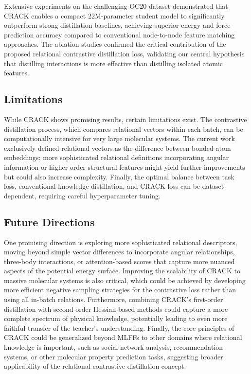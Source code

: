\documentclass{article}
\begin{document}
Extensive experiments on the challenging OC20 dataset demonstrated that CRACK enables a compact 22M-parameter student model to significantly outperform strong distillation baselines, achieving superior energy and force prediction accuracy compared to conventional node-to-node feature matching approaches.
The ablation studies confirmed the critical contribution of the proposed relational contrastive distillation loss, validating our central hypothesis that distilling interactions is more effective than distilling isolated atomic features.


\subsection{Limitations}

While CRACK shows promising results, certain limitations exist. 
The contrastive distillation process, which compares relational vectors within each batch, can be computationally intensive for very large molecular systems.
The current work exclusively defined relational vectors as the difference between bonded atom embeddings; more sophisticated relational definitions incorporating angular information or higher-order structural features might yield further improvements but could also increase complexity. 
Finally, the optimal balance between task loss, conventional knowledge distillation, and CRACK loss can be dataset-dependent, requiring careful hyperparameter tuning.


\subsection{Future Directions}

One promising direction is exploring more sophisticated relational descriptors, moving beyond simple vector differences to incorporate angular relationships, three-body interactions, or attention-based scores that capture more nuanced aspects of the potential energy surface.
Improving the scalability of CRACK to massive molecular systems is also critical, which could be achieved by developing more efficient negative sampling strategies for the contrastive loss rather than using all in-batch relations.
Furthermore, combining CRACK's first-order distillation with second-order Hessian-based methods could capture a more complete spectrum of physical knowledge, potentially leading to even more faithful transfer of the teacher's understanding.
Finally, the core principles of CRACK could be generalized beyond MLFFs to other domains where relational knowledge is important, such as social network analysis, recommendation systems, or other molecular property prediction tasks, suggesting broader applicability of the relational-contrastive distillation concept.
\end{document}
